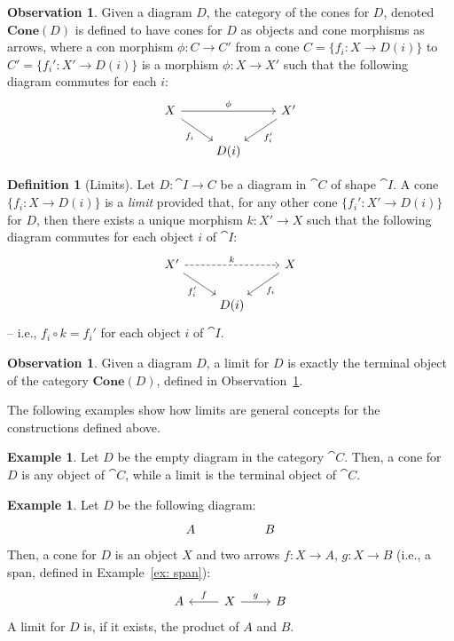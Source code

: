 \documentclass[a4paper, twoside,openright]{report}
\theoremstyle{plain}
\theoremstyle{definition}
\newtheorem{definition}[theorem]{Definition}
\newtheorem{example}[theorem]{Example}
\newtheorem{obs}[theorem]{Observation}
\begin{document}
\begin{obs}\label{obs:category_of_cones}
    Given a diagram $D$, the category of the cones for $D$, denoted $\textbf{Cone}(D)$ is defined to have cones for $D$ as objects and cone morphisms as arrows, where a con morphism $\phi: C \rightarrow C'$ from a cone $C = \{f_i: X \rightarrow D(i)\}$ to $C' = \{f_i':X' \rightarrow D(i)\}$ is a morphism $\phi: X \rightarrow X'$ such that the following diagram commutes for each $i$:
    \[
        \begin{tikzcd}
            X \arrow[rr, "{\phi}"] \arrow[dr, "{f_i}" swap] & & X' \arrow[dl, "{f_i'}"] \\
            & D(i) &
        \end{tikzcd}
    \]
\end{obs}

\begin{definition}[Limits]\label{def:limit}
    Let $D:\cat {I \rightarrow C}$ be a diagram in $\cat C$ of shape $\cat I$. A cone $\{f_i: X \rightarrow D(i)\}$ is a \emph{limit} provided that, for any other cone $\{f_{i}': X' \rightarrow D(i)\}$ for $D$, then there exists a unique morphism $k: X' \rightarrow X$ such that the following diagram commutes for each object $i$ of $\cat I$:
    \[
        \begin{tikzcd}
            X' \arrow[rr, dashed, "k"] \arrow[dr, "{f_i'}" swap] & & X \arrow[dl, "{f_i}"] \\
            & D(i) &
        \end{tikzcd}
    \]
    -- i.e., $f_i \circ k = f_i'$ for each object $i$ of $\cat I$.
\end{definition}

\begin{obs}
    Given a diagram $D$, a limit for $D$ is exactly the terminal object of the category $\textbf{Cone}(D)$, defined in Observation~\ref{obs:category_of_cones}.
\end{obs}

The following examples show how limits are general concepts for the constructions defined above.

\begin{example}
    Let $D$ be the empty diagram in the category $\cat C$. Then, a cone for $D$ is any object of $\cat C$, while a limit is the terminal object of $\cat C$.
\end{example}

\begin{example}\label{ex:product_are_limits}
    Let $D$ be the following diagram:
    \[
        \begin{tikzcd}
            A & & B
        \end{tikzcd}
    \]
    Then, a cone for $D$ is an object $X$ and two arrows $f: X \rightarrow A$, $g: X \rightarrow B$ (i.e., a span, defined in Example~\ref{ex: span}):
    \[
        \begin{tikzcd}
            A & X \arrow[l, "f" swap] \arrow[r, "g"] & B
        \end{tikzcd}
    \]
    A limit for $D$ is, if it exists, the product of $A$ and $B$.
\end{example}
\end{document}
